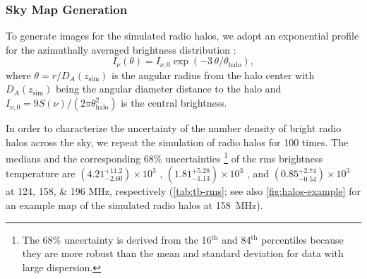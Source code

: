 \documentclass[twocolumn]{aastex62}
\newcommand{\R}[1]{\mathrm{#1}}
\begin{document}
\subsubsection{Sky Map Generation}
\label{sec:skymaps}

To generate images for the simulated radio halos, we adopt an
exponential profile for the azimuthally averaged brightness distribution
\citep{murgia2009}:
\begin{equation}
  \label{eq:halo-profile}
  I_{\nu}(\theta) = I_{\nu,0} \exp(-3 \,\theta / \theta_{\R{halo}}),
\end{equation}
where $\theta = r / D_{\!A}(z_{\R{sim}})$ is the angular radius from the
halo center with $D_{\!A}(z_{\R{sim}})$ being the angular diameter
distance to the halo
and $I_{\nu,0} = 9 S(\nu) / (2\pi \theta^2_{\R{halo}})$ is the central
brightness.

In order to characterize the uncertainty of the number density of bright
radio halos across the sky, we repeat the simulation of radio halos
for 100 times.
The medians and the corresponding 68\% uncertainties%
\footnote{%
  The 68\% uncertainty is derived from the 16$^{\text{th}}$
  and 84$^{\text{th}}$ percentiles because they are more robust than the
  mean and standard deviation for data with large dispersion.}
of the rms brightness temperature are
$\left(4.21_{-2.60}^{+11.2}\right) \times 10^3$ \si{\mK},
$\left(1.81_{-1.13}^{+5.28}\right) \times 10^3$ \si{\mK}, and
$\left(0.85_{-0.54}^{+2.74}\right) \times 10^3$ \si{\mK}
at \numlist{124; 158; 196} \si{\MHz}, respectively
(\autoref{tab:tb-rms}; see also \autoref{fig:halos-example} for an
example map of the simulated radio halos at \SI{158}{\MHz}).
\end{document}
